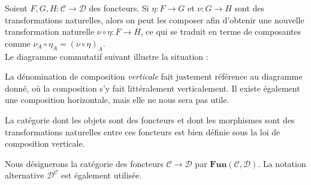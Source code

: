 \documentclass{article}
\begin{document}
\begin{definition}{}
    Soient $F, G, H:\mathcal C\to\mathcal D$ des foncteurs. Si $\eta:F\to G$ et $\nu:G\to H$ sont des transformations naturelles, alors on peut les composer afin d'obtenir une nouvelle transformation naturelle $\nu\circ\eta:F\to H$, ce qui se traduit en terme de composantes comme $\nu_A\circ\eta_A=(\nu\circ\eta)_A$.\\
    
    \noindent
    Le diagramme commutatif suivant illustre la situation :
    \begin{center}
    \end{center}
\end{definition}

La dénomination de composition \textit{verticale} fait justement référence au diagramme donné, où la composition s'y fait littéralement verticalement. Il existe également une composition horizontale, mais elle ne nous sera pas utile.

\begin{lemma}{}
    La catégorie dont les objets sont des foncteurs et dont les morphismes sont des transformations naturelles entre ces foncteurs est bien définie sous la loi de composition verticale.
\end{lemma}

\noindent
Nous désignerons la catégorie des foncteurs $\mathcal C\to\mathcal D$ par $\textbf{Fun}(\mathcal C, \mathcal D)$. La notation alternative $\mathcal D^\mathcal C$ est également utilisée.
\end{document}
